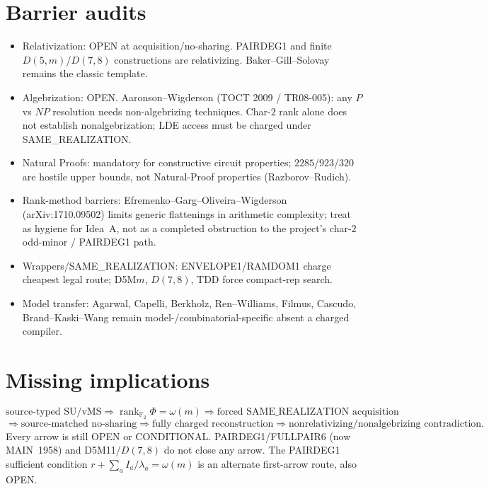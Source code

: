 \documentclass[11pt]{article}
\begin{document}
\section*{Barrier audits}
\begin{itemize}
\item Relativization: OPEN at acquisition/no-sharing. PAIRDEG1 and finite
$D(5,m)$/$D(7,8)$ constructions are relativizing. Baker--Gill--Solovay remains
the classic template.
\item Algebrization: OPEN. Aaronson--Wigderson (TOCT 2009 / TR08-005): any
$P$ vs $NP$ resolution needs non-algebrizing techniques. Char-$2$ rank alone does
not establish nonalgebrization; LDE access must be charged under SAME\_REALIZATION.
\item Natural Proofs: mandatory for constructive circuit properties; $2285$/$923$/$320$
are hostile upper bounds, not Natural-Proof properties (Razborov--Rudich).
\item Rank-method barriers: Efremenko--Garg--Oliveira--Wigderson (arXiv:1710.09502)
limits generic flattenings in arithmetic complexity; treat as hygiene for Idea~A,
not as a completed obstruction to the project's char-$2$ odd-minor / PAIRDEG1 path.
\item Wrappers/SAME\_REALIZATION: ENVELOPE1/RAMDOM1 charge cheapest legal route;
D5M$m$, $D(7,8)$, TDD force compact-rep search.
\item Model transfer: Agarwal, Capelli, Berkholz, Ren--Williams, Filmus,
Cascudo, Brand--Kaski--Wang remain model-/combinatorial-specific absent a charged
compiler.
\end{itemize}

\section*{Missing implications}
\[
\text{source-typed SU/vMS}
\Longrightarrow
\operatorname{rank}_{\mathbb F_2}\Phi=\omega(m)
\Longrightarrow
\text{forced SAME\_REALIZATION acquisition}
\]
\[
\Longrightarrow
\text{source-matched no-sharing}
\Longrightarrow
\text{fully charged reconstruction}
\Longrightarrow
\text{nonrelativizing/nonalgebrizing contradiction}.
\]
Every arrow is still OPEN or CONDITIONAL. PAIRDEG1/FULLPAIR6 (now MAIN~1958)
and D5M11/$D(7,8)$ do not close any arrow. The PAIRDEG1 sufficient condition
$r+\sum_a I_a/\lambda_a=\omega(m)$ is an alternate first-arrow route, also OPEN.
\end{document}
